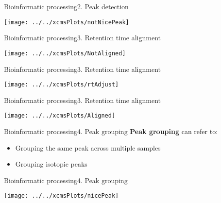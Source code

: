 \documentclass[xcolor=dvipsnames]{beamer}
\begin{document}
\begin{frame}{Bioinformatic processing}{2. Peak detection}
\vspace{-10pt}
\begin{center}
	\texttt{[image: ../../xcmsPlots/notNicePeak]}
\end{center}
\end{frame}

\begin{frame}{Bioinformatic processing}{3. Retention time alignment}
\vspace{-10pt}
\begin{center}
	\texttt{[image: ../../xcmsPlots/NotAligned]}
\end{center}
\end{frame}

\begin{frame}{Bioinformatic processing}{3. Retention time alignment}
\vspace{-10pt}
\begin{center}
\texttt{[image: ../../xcmsPlots/rtAdjust]}
\end{center}
\end{frame}

\begin{frame}{Bioinformatic processing}{3. Retention time alignment}
\vspace{-10pt}
\begin{center}
	\texttt{[image: ../../xcmsPlots/Aligned]}
\end{center}
\end{frame}

\begin{frame}{Bioinformatic processing}{4. Peak grouping}
\vspace{-7pt}
\textbf{Peak grouping} can refer to: \pause
		\begin{itemize}
			\item Grouping the same peak across multiple samples \pause
			\item Grouping isotopic peaks 
		\end{itemize}
\end{frame}

\begin{frame}{Bioinformatic processing}{4. Peak grouping}
\vspace{-10pt}
\begin{center}
	\texttt{[image: ../../xcmsPlots/nicePeak]}
\end{center}
\end{frame}
\end{document}

